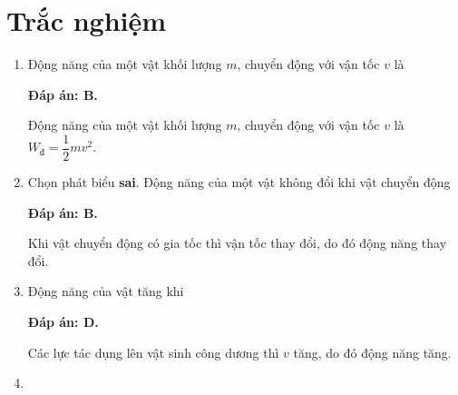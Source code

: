 \section{Trắc nghiệm}
\begin{enumerate}[label=\bfseries Câu \arabic*:]
	\item {}
	
	{
			Động năng của một vật khối lượng $m$, chuyển động với vận tốc $v$ là
	}
	
	\hideall
	{	
		\textbf{Đáp án: B.}
		
		Động năng của một vật khối lượng $m$, chuyển động với vận tốc $v$ là $W_\text{đ} = \dfrac{1}{2}mv^2$.
	}
	\item {}
	
	{
		Chọn phát biểu \textbf{sai}. Động năng của một vật không đổi khi vật chuyển động
	}
	
	\hideall
	{	
			\textbf{Đáp án: B.}
		
		Khi vật chuyển động có gia tốc thì vận tốc thay đổi, do đó động năng thay đổi.
	}
	\item {}
	
	
	{
		Động năng của vật tăng khi
	}
	
	\hideall
	{	
		\textbf{Đáp án: D.}
		
		Các lực tác dụng lên vật sinh công dương thì $v$ tăng, do đó động năng tăng.
	}
	\item {}
	

\end{enumerate}
